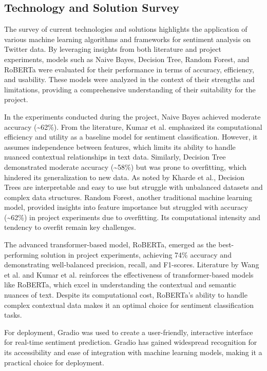\documentclass[journal]{IEEEtran}
\begin{document}
\subsection{Technology and Solution Survey}
The survey of current technologies and solutions highlights the application of various machine learning algorithms and frameworks for sentiment analysis on Twitter data. By leveraging insights from both literature and project experiments, models such as Naive Bayes, Decision Tree, Random Forest, and RoBERTa were evaluated for their performance in terms of accuracy, efficiency, and usability. These models were analyzed in the context of their strengths and limitations, providing a comprehensive understanding of their suitability for the project.

In the experiments conducted during the project, Naive Bayes achieved moderate accuracy (\textasciitilde62\%). From the literature, Kumar et al. emphasized its computational efficiency and utility as a baseline model for sentiment classification. However, it assumes independence between features, which limits its ability to handle nuanced contextual relationships in text data. Similarly, Decision Tree demonstrated moderate accuracy (\textasciitilde58\%) but was prone to overfitting, which hindered its generalization to new data. As noted by Kharde et al., Decision Trees are interpretable and easy to use but struggle with unbalanced datasets and complex data structures. Random Forest, another traditional machine learning model, provided insights into feature importance but struggled with accuracy (\textasciitilde62\%) in project experiments due to overfitting. Its computational intensity and tendency to overfit remain key challenges.

The advanced transformer-based model, RoBERTa, emerged as the best-performing solution in project experiments, achieving 74\% accuracy and demonstrating well-balanced precision, recall, and F1-scores. Literature by Wang et al. and Kumar et al. reinforces the effectiveness of transformer-based models like RoBERTa, which excel in understanding the contextual and semantic nuances of text. Despite its computational cost, RoBERTa's ability to handle complex contextual data makes it an optimal choice for sentiment classification tasks.

For deployment, Gradio was used to create a user-friendly, interactive interface for real-time sentiment prediction. Gradio has gained widespread recognition for its accessibility and ease of integration with machine learning models, making it a practical choice for deployment.
\end{document}
